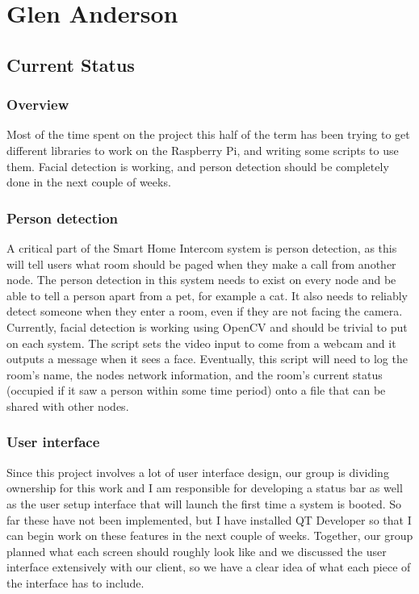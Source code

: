 \documentclass[onecolumn, draftclsnofoot,10pt, compsoc]{IEEEtran}
\begin{document}
\section{Glen Anderson}
\subsection{Current Status}

\subsubsection{Overview}
Most of the time spent on the project this half of the term has been trying to get different libraries to work on the Raspberry Pi, and writing some scripts to use them. Facial detection is working, and person detection should be completely done in the next couple of weeks. 

\subsubsection{Person detection}
A critical part of the Smart Home Intercom system is person detection, as this will tell users what room should be paged when they make a call from another node. The person detection in this system needs to exist on every node and be able to tell a person apart from a pet, for example a cat. It also needs to reliably detect someone when they enter a room, even if they are not facing the camera. Currently, facial detection is working using OpenCV and should be trivial to put on each system. The script sets the video input to come from a webcam and it outputs a message when it sees a face. Eventually, this script will need to log the room’s name, the nodes network information, and the room’s current status (occupied if it saw a person within some time period) onto a file that can be shared with other nodes. 

\subsubsection{User interface}
Since this project involves a lot of user interface design, our group is dividing ownership for this work and I am responsible for developing a status bar as well as the user setup interface that will launch the first time a system is booted. So far these have not been implemented, but I have installed QT Developer so that I can begin work on these features in the next couple of weeks. Together, our group planned what each screen should roughly look like and we discussed the user interface extensively with our client, so we have a clear idea of what each piece of the interface has to include. 
\end{document}
